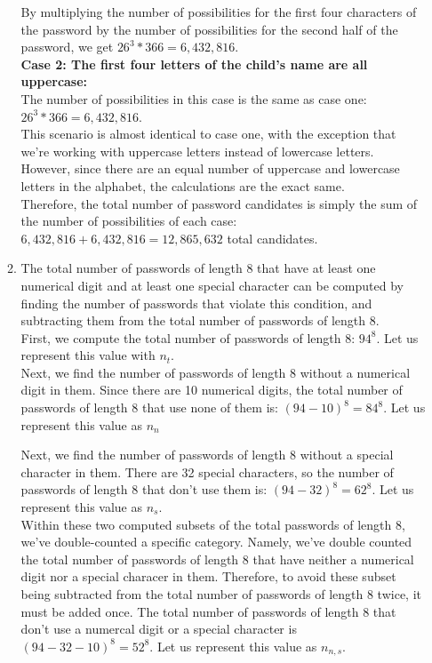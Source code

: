 \documentclass[11pt]{article}
\theoremstyle{definition}
\begin{document}
\begin{enumerate}
\begin{enumerate}
By multiplying the number of possibilities for the first four characters of the password by the number of possibilities for the second half of the password,
we get $26^3 * 366 = 6,432,816 $.\\

\textbf{Case 2: The first four letters of the child's name are all uppercase:}\\
The number of possibilities in this case is the same as case one: $26^3 * 366 = 6,432,816$.\\
This scenario is almost identical to case one, with the exception that we're working with uppercase letters instead of lowercase letters. However, since there
are an equal number of uppercase and lowercase letters in the alphabet, the calculations are the exact same.\\

Therefore, the total number of password candidates is simply the sum of the number of possibilities of each case: $6,432,816 + 6,432,816 = 12,865,632$ total candidates.\\

\item The total number of passwords of length 8 that have at least one numerical digit and at least one special character can be computed by finding the number of passwords that
violate this condition, and subtracting them from the total number of passwords of length 8.\\ 

First, we compute the total number of passwords of length 8: $94^8$. Let us represent this value with $n_t$.\\

Next, we find the number of passwords of length 8 without a numerical digit in them. Since there are 10 numerical digits, the total number of passwords of length 8 that use none of them is:
$(94-10)^8 = 84^8$. Let us represent this value as $n_n$

Next, we find the number of passwords of length 8 without a special character in them. There are 32 special characters, so the number of passwords of length 8 
that don't use them is: $(94-32)^8 = 62^8$. Let us represent this value as $n_s$.\\

Within these two computed subsets of the total passwords of length 8, we've double-counted a specific category. 
Namely, we've double counted the total number of passwords of length 8 that have neither a numerical digit nor a special characer in them. 
Therefore, to avoid these subset being subtracted from the total number of passwords of length 8 twice, it must be added once. The total number of passwords of 
length 8 that don't use a numercal digit or a special character is $(94 - 32 - 10)^8 = 52^8$. Let us represent this value as $n_{n,s}$.\\ 


\end{enumerate}
\end{enumerate}
\end{document}

